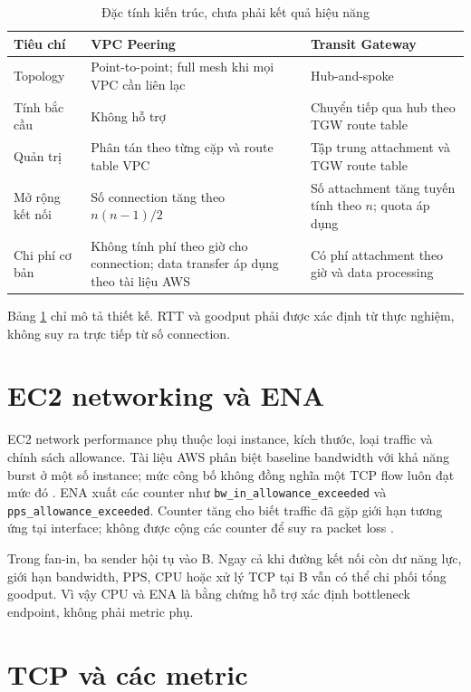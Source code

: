 \begin{table}[H]
\centering
\caption{Đặc tính kiến trúc, chưa phải kết quả hiệu năng}
\label{tab:architecture-comparison}
\begin{tabularx}{\textwidth}{p{}XX}
\toprule
\textbf{Tiêu chí} & \textbf{VPC Peering} & \textbf{Transit Gateway} \\
\midrule
Topology & Point-to-point; full mesh khi mọi VPC cần liên lạc & Hub-and-spoke \\
Tính bắc cầu & Không hỗ trợ & Chuyển tiếp qua hub theo TGW route table \\
Quản trị & Phân tán theo từng cặp và route table VPC & Tập trung attachment và TGW route table \\
Mở rộng kết nối & Số connection tăng theo $n(n-1)/2$ & Số attachment tăng tuyến tính theo $n$; quota áp dụng \cite{aws-tgw-quotas} \\
Chi phí cơ bản & Không tính phí theo giờ cho connection; data transfer áp dụng theo tài liệu AWS \cite{aws-peering-pricing} & Có phí attachment theo giờ và data processing \cite{aws-tgw-pricing} \\
\bottomrule
\end{tabularx}
\end{table}

Bảng \ref{tab:architecture-comparison} chỉ mô tả thiết kế. RTT và goodput phải
được xác định từ thực nghiệm, không suy ra trực tiếp từ số connection.

\section{EC2 networking và ENA}

EC2 network performance phụ thuộc loại instance, kích thước, loại traffic và
chính sách allowance. Tài liệu AWS phân biệt baseline bandwidth với khả năng
burst ở một số instance; mức công bố không đồng nghĩa một TCP flow luôn đạt
mức đó \cite{aws-ec2-bandwidth}. ENA xuất các counter như
\nolinkurl{bw_in_allowance_exceeded} và
\nolinkurl{pps_allowance_exceeded}. Counter tăng cho biết traffic đã gặp giới
hạn tương ứng tại interface; không được cộng các counter để suy ra packet loss
\cite{aws-ena-metrics}.

Trong fan-in, ba sender hội tụ vào B. Ngay cả khi đường kết nối còn dư năng
lực, giới hạn bandwidth, PPS, CPU hoặc xử lý TCP tại B vẫn có thể chi phối tổng
goodput. Vì vậy CPU và ENA là bằng chứng hỗ trợ xác định bottleneck endpoint,
không phải metric phụ.

\section{TCP và các metric}

